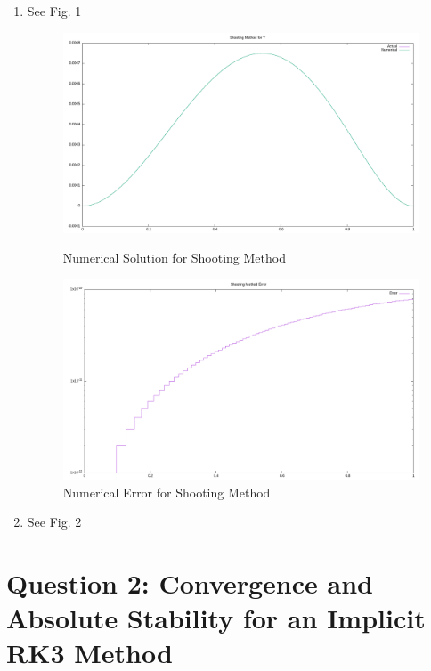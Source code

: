 \documentclass{article}
\begin{document}
\begin{enumerate}[label=\alph*)]
  \item See Fig. 1
    \begin{figure}[ht]
        \centering 
        \begin{minipage}{0.49\textwidth}
            \centering 
            \includegraphics[width=1\textwidth]{rk4_y.png}
            \caption{Numerical Solution for Shooting Method}
        \end{minipage}
        \begin{minipage}{0.49\textwidth}
            \centering 
            \includegraphics[width=1\textwidth]{rk4_error.png}
            \caption{Numerical Error for Shooting Method}
        \end{minipage}
    \end{figure}

  \item See Fig. 2
        
\end{enumerate}


\section*{Question 2: Convergence and Absolute Stability for an Implicit RK3
Method}
\end{document}

